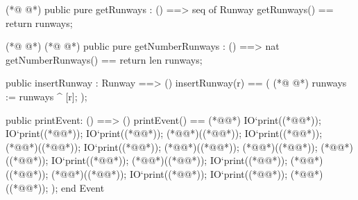\begin{vdmpp}[breaklines=true]
(*@
\label{getRunways:74}
@*)
  public pure getRunways : () ==> seq of Runway
     getRunways() == return runways;
 
(*@
\label{insertRunway:77}
@*)
(*@
\label{getNumberRunways:77}
@*)
  public pure getNumberRunways : () ==> nat
     getNumberRunways() == return len runways;
     
  public insertRunway : Runway ==> ()
   insertRunway(r) ==
   (
(*@
\label{printEvent:83}
@*)
     runways := runways ^  [r];
   );
  
  public printEvent: () ==> ()
  printEvent() == (*@\vdmnotcovered{(}@*)
  IO`print((*@@*));
   IO`print((*@@*));
   IO`print((*@@*));
   (*@@*)((*@@*));
   IO`print((*@@*));
   (*@@*)((*@@*));
   IO`print((*@@*));
   (*@@*)((*@@*));
   (*@@*)((*@@*));
   (*@@*)((*@@*));
    IO`print((*@@*));
   (*@@*)((*@@*));
   IO`print((*@@*));
   (*@@*)((*@@*));
   (*@@*)((*@@*));
   IO`print((*@@*));
   IO`print((*@@*));
   (*@@*)((*@@*));
  );
end Event
\end{vdmpp}
\bigskip
